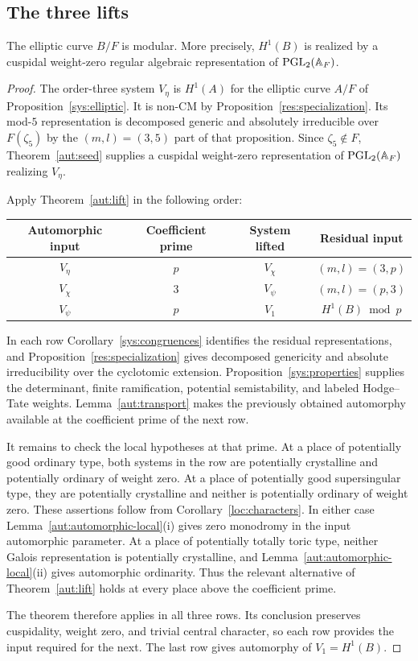 \subsection{The three lifts}

\begin{proposition}\label{aut:over-F}
The elliptic curve $B/F$ is modular. More precisely, $H^1(B)$ is realized
by a cuspidal weight-zero regular algebraic representation of
$\operatorname{PGL}_2(\mathbb A_F)$.
\end{proposition}
\begin{proof}
The order-three system $V_\eta$ is $H^1(A)$ for the elliptic curve
$A/F$ of Proposition~\ref{sys:elliptic}. It is non-CM by
Proposition~\ref{res:specialization}. Its mod-$5$ representation is
decomposed generic and absolutely irreducible over $F(\zeta_5)$ by the
$(m,l)=(3,5)$ part of that proposition. Since $\zeta_5\notin F$,
Theorem~\ref{aut:seed} supplies a cuspidal weight-zero representation of
$\operatorname{PGL}_2(\mathbb A_F)$ realizing $V_\eta$.

Apply Theorem~\ref{aut:lift} in the following order:
\begin{center}
\begin{tabular}{@{}cccc@{}}
\toprule
Automorphic input & Coefficient prime & System lifted & Residual input\\
\midrule
$V_\eta$ & $p$ & $V_\chi$ & $(m,l)=(3,p)$\\
$V_\chi$ & $3$ & $V_\psi$ & $(m,l)=(p,3)$\\
$V_\psi$ & $p$ & $V_1$ & $H^1(B)\bmod p$\\
\bottomrule
\end{tabular}
\end{center}
In each row Corollary~\ref{sys:congruences} identifies the residual
representations, and Proposition~\ref{res:specialization} gives decomposed
genericity and absolute irreducibility over the cyclotomic extension.
Proposition~\ref{sys:properties} supplies the determinant, finite
ramification, potential semistability, and labeled Hodge--Tate weights.
Lemma~\ref{aut:transport} makes the previously obtained automorphy
available at the coefficient prime of the next row.

It remains to check the local hypotheses at that prime. At a place of
potentially good ordinary type, both systems in the row are potentially
crystalline and potentially ordinary of weight zero. At a place of
potentially good supersingular type, they are potentially crystalline
and neither is potentially ordinary of weight zero. These assertions
follow from Corollary~\ref{loc:characters}. In either case
Lemma~\ref{aut:automorphic-local}(i) gives zero monodromy in the input
automorphic parameter. At a place of potentially totally toric type,
neither Galois representation is potentially crystalline, and
Lemma~\ref{aut:automorphic-local}(ii) gives automorphic ordinarity.
Thus the relevant alternative of Theorem~\ref{aut:lift} holds at every
place above the coefficient prime.

The theorem therefore applies in all three rows. Its conclusion preserves
cuspidality, weight zero, and trivial central character, so each row
provides the input required for the next. The last row gives automorphy of
$V_1=H^1(B)$.
\end{proof}

